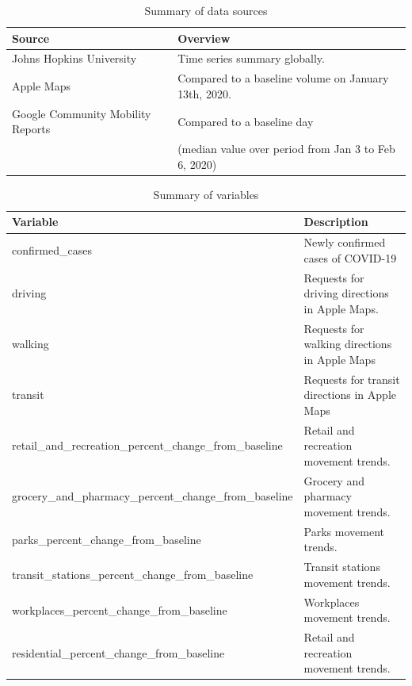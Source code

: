 \documentclass[titlepage,oneside,12pt]{article}
\newcommand{\?}{\stackrel{?}{=}}
\begin{document}
\begin{table}[h!]\small
  \centering
  \caption{Summary of data sources}
  \label{tab:sources}
\begin{tabular}{ll}\toprule
\bf Source                         & \bf Overview                                                                              \\\midrule
Johns Hopkins University          & Time series summary globally.                                                               \\
Apple Maps                        & Compared to a baseline volume on January 13th, 2020.                                          \\
  Google Community Mobility Reports & Compared to a baseline day \\
  & (median value over period from Jan 3 to Feb 6, 2020)\\\bottomrule
\end{tabular}
\end{table}

\begin{table}[h!]
  \centering
\caption{Summary of variables}
\label{tab:variables}
\small
\begin{tabular}{ll}\toprule
\textbf{Variable}                                         & \textbf{Description}                                    \\\midrule
confirmed\_cases                                         & Newly confirmed cases of COVID-19              \\
driving                                                  & Requests for driving directions in Apple Maps.    \\
walking                                                  & Requests for walking directions in Apple Maps   \\
transit                                                  & Requests for transit directions in Apple Maps   \\
retail\_and\_recreation\_percent\_change\_from\_baseline & Retail and recreation movement trends.            \\
grocery\_and\_pharmacy\_percent\_change\_from\_baseline  & Grocery and pharmacy movement trends.             \\
parks\_percent\_change\_from\_baseline                   & Parks movement trends.                           \\
transit\_stations\_percent\_change\_from\_baseline       & Transit stations movement trends.                \\
workplaces\_percent\_change\_from\_baseline              & Workplaces movement trends.                      \\
residential\_percent\_change\_from\_baseline             & Retail and recreation movement trends.          \\\bottomrule
\end{tabular}
\end{table}
\end{document}
